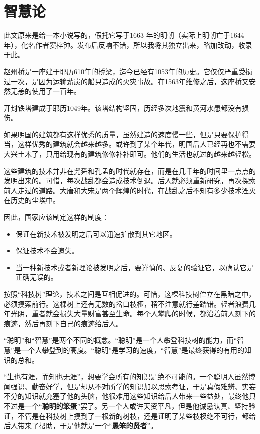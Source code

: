 \chapter{智慧论}
\begin{quoting}
此文原来是给一本小说写的，假托它写于1663 年的明朝（实际上明朝亡于1644 年），化名作者窦梓钟。发布后反响不错，所以我将其独立出来，略加改动，收录于此。
\end{quoting}

赵州桥是一座建于耶历610年的桥梁，迄今已经有1053年的历史。它仅仅严重受损过一次，是因为运输薪炭的船只造成的火灾事故。在1563年维修之后，这座桥又安然无恙的使用了一百年。

开封铁塔建成于耶历1049年。该塔结构坚固，历经多次地震和黄河水患都没有损伤。

如果明国的建筑都有这样优秀的质量，虽然建造的速度慢一些，但是只要保护得当，这样优秀的建筑就会越来越多。或许到了某个年代，明国后人已经再也不需要大兴土木了，只用给现有的建筑修修补补即可。他们的生活也就过的越来越轻松。

这些建筑的技术并非在尧舜和孔孟的时代就存在，而是在几千年的时间里一点点的发明出来的。可惜，每次战乱都会造成技术倒退。后人就必须重新研究，再次探索前人走过的道路。大唐和大宋是两个辉煌的时代，在战乱之后不知有多少技术湮灭在历史的尘埃中。

因此，国家应该制定这样的制度：
\begin{itemize}
\item 保证在新技术被发明之后可以迅速扩散到其它地区。
\item 保证技术不会遗失。
\item 当一种新技术或者新理论被发明之后，要谨慎的、反复的验证它，以确认它是正确无误的。
\end{itemize}

按照“科技树”理论，技术之间是互相促进的。可惜，这棵科技树伫立在黑暗之中，必须摸索前行。这棵树上还有无数的岔口枝桠，稍不注意就行差踏错。轻者浪费几年光阴，重者就会损失大量财富甚至生命。每个人攀爬的时候，都沿着前人刻下的痕迹，然后再刻下自己的痕迹给后人。

“聪明”和“智慧”是两个不同的概念。“聪明”是一个人攀登科技树的能力，而“智慧”是一个人攀登到的高度。“聪明”是学习的速度，“智慧”是最终获得的有用的知识的总和。

“生也有涯，而知也无涯”，想要学会所有的知识是绝不可能的。一个聪明人虽然博闻强识、勤奋好学，但是却从不对所学的知识加以思索考证，于是真假难辨、实妄不分的知识就充塞了他的头脑，他很难用这些知识给后人带来一些益处，最终他只不过是一个“\textbf{聪明的笨蛋}”罢了。另一个人或许天资平凡，但是他诚恳认真、坚持验证，不管是在科技树上摸到了一根新的树枝，还是证明了某些枝杈绝不可行，都给后人带来了帮助，于是他就是一个“\textbf{愚笨的贤者}”。

